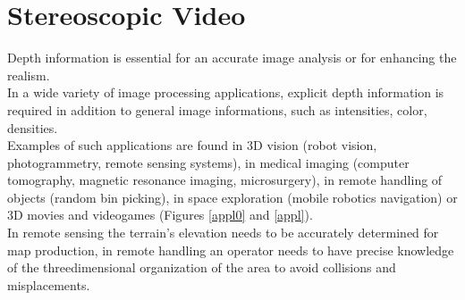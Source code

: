 \chapter{Stereoscopic Video}
\label{stereo_video}

Depth information is essential for an accurate image analysis or for enhancing the realism.\\
In a wide variety of image processing applications, explicit depth information is required in
addition to general image informations, such as intensities, color, densities.\\
Examples of such applications are found in 3D vision (robot vision, photogrammetry, remote sensing systems), in medical imaging (computer tomography,
magnetic resonance imaging, microsurgery), in remote handling of objects (random bin picking), in space exploration (mobile robotics navigation) or 3D movies and videogames (Figures \ref{appl0} and \ref{appl}).\\
In remote sensing the terrain's elevation needs to be accurately determined for map production, in remote handling an operator needs to have precise knowledge of the threedimensional organization of the area to avoid collisions and misplacements.\\
